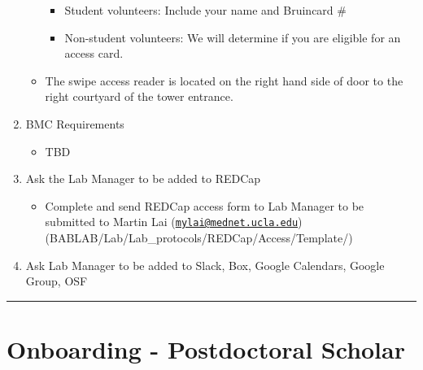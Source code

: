 \documentclass[
]{book}
\providecommand{\tightlist}{%
  \setlength{\itemsep}{0pt}\setlength{\parskip}{0pt}}
\begin{document}
\begin{enumerate}
\begin{itemize}
    \begin{itemize}
    \tightlist
    \item
      Student volunteers: Include your name and Bruincard \#
    \item
      Non-student volunteers: We will determine if you are eligible for an access card.
    \end{itemize}
  \item
    The swipe access reader is located on the right hand side of door to the right courtyard of the tower entrance.
  \end{itemize}
\item
  BMC Requirements

  \begin{itemize}
  \tightlist
  \item
    TBD
  \end{itemize}
\item
  Ask the Lab Manager to be added to REDCap

  \begin{itemize}
  \tightlist
  \item
    Complete and send REDCap access form to Lab Manager to be submitted to Martin Lai (\href{mailto:mylai@mednet.ucla.edu}{\nolinkurl{mylai@mednet.ucla.edu}}) (BABLAB/Lab/Lab\_protocols/REDCap/Access/Template/)
  \end{itemize}
\item
  Ask Lab Manager to be added to Slack, Box, Google Calendars, Google Group, OSF
\end{enumerate}

\begin{center}\rule{0.5\linewidth}{0.5pt}\end{center}

\hypertarget{onboarding---postdoctoral-scholar}{%
\section{Onboarding - Postdoctoral Scholar}\label{onboarding---postdoctoral-scholar}}
\end{document}

